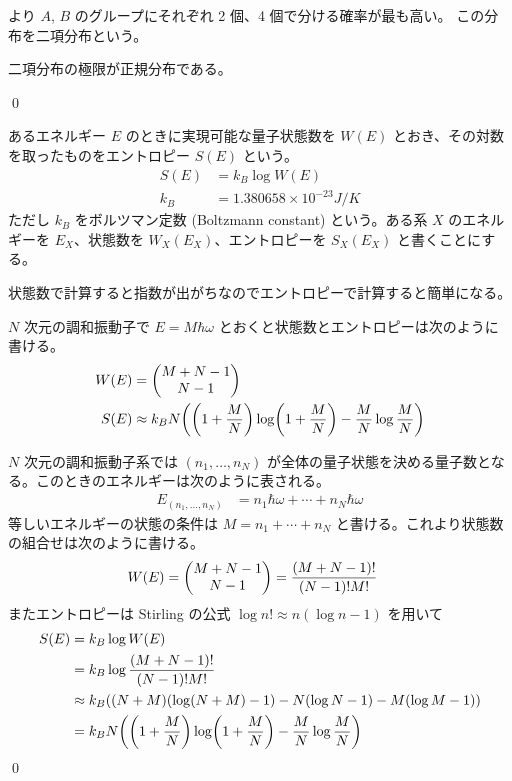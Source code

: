 \documentclass[uplatex,dvipdfmx,a4paper,11pt]{jlreq}
\makeatletter
\theoremstyle{definition}
\renewenvironment{proof}[1][\proofname]{\par
  \normalfont
  \topsep6\p@\@plus6\p@ \trivlist
  \item[\hskip\labelsep{\bfseries #1}\@addpunct{\bfseries}]\ignorespaces\quad\par
}{%
  \qed\endtrivlist\@endpefalse
}
\renewcommand\proofname{証明}
\makeatother
\begin{document}
より $A$, $B$ のグループにそれぞれ 2 個、4 個で分ける確率が最も高い。
この分布を二項分布という。

\begin{proposition}
  二項分布の極限が正規分布である。
\end{proposition}
\begin{proof}
\end{proof}

\begin{definition}
  あるエネルギー $E$ のときに実現可能な量子状態数を $W(E)$ とおき、その対数を取ったものをエントロピー $S(E)$ という。
  \begin{align}
    S(E) & = k_B\log W(E)                     \\
    k_B  & = 1.380658\times 10^{-23} \si{J/K}
  \end{align}
  ただし $k_B$ をボルツマン定数 (Boltzmann constant) という。ある系 $X$ のエネルギーを $E_X$、状態数を $W_X(E_X)$、エントロピーを $S_X(E_X)$ と書くことにする。
\end{definition}
状態数で計算すると指数が出がちなのでエントロピーで計算すると簡単になる。

\begin{theorem}
  $N$ 次元の調和振動子で $E = M\hbar\omega$ とおくと状態数とエントロピーは次のように書ける。
  \begin{align}
    W(E) & = \mqty(M + N - 1                                                                         \\ N - 1) \\
    S(E) & \approx k_BN\qty(\qty(1 + \frac{M}{N})\log(1 + \frac{M}{N}) - \frac{M}{N}\log\frac{M}{N})
  \end{align}
\end{theorem}
\begin{proof}
  $N$ 次元の調和振動子系では $(n_1,\ldots,n_N)$ が全体の量子状態を決める量子数となる。このときのエネルギーは次のように表される。
  \begin{align}
    E_{(n_1,\ldots,n_N)} & = n_1\hbar\omega + \cdots + n_N\hbar\omega
  \end{align}
  等しいエネルギーの状態の条件は $M = n_1 + \cdots + n_N$ と書ける。これより状態数の組合せは次のように書ける。
  \begin{align}
    W(E) & = \mqty(M + N - 1 \\ N - 1) = \frac{(M + N - 1)!}{(N - 1)!M!}
  \end{align}
  またエントロピーは Stirling の公式 $\log n! \approx n(\log n - 1)$ を用いて
  \begin{align}
    S(E) & = k_B\log W(E)                                                                      \\
         & = k_B\log\frac{(M + N - 1)!}{(N - 1)!M!}                                            \\
         & \approx k_B\qty((N + M)(\log(N + M) - 1) - N(\log N - 1) - M(\log M - 1))           \\
         & = k_BN\qty(\qty(1 + \frac{M}{N})\log(1 + \frac{M}{N}) - \frac{M}{N}\log\frac{M}{N})
  \end{align}
\end{proof}
\end{document}
